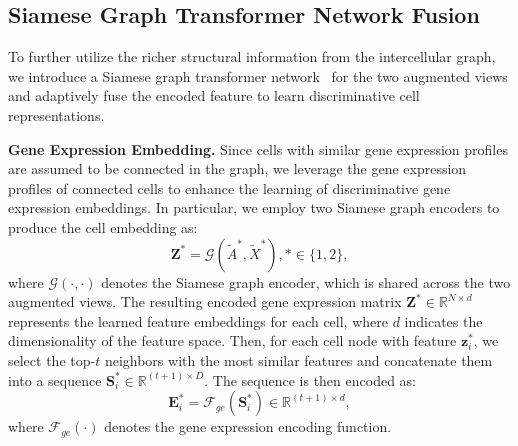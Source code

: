 


\subsection{Siamese Graph Transformer Network Fusion}
To further utilize the richer structural information from the intercellular graph, we introduce a Siamese graph transformer network~\cite{wang2025deep} for the two augmented views and adaptively fuse the encoded feature to learn discriminative cell representations.

\smallskip\noindent\textbf{Gene Expression Embedding.}
Since cells with similar gene expression profiles are assumed to be connected in the graph, we leverage the gene expression profiles of connected cells to enhance the learning of discriminative gene expression embeddings. In particular, we employ two Siamese graph encoders to produce the cell embedding as:
\begin{equation}
     \bm{Z}^*=\mathcal{G}(\tilde{A}^*,\tilde{X}^*), *\in\{1,2\},
\end{equation}
where $\mathcal{G}(\cdot,\cdot)$ denotes the Siamese graph encoder, which is shared across the two augmented views. The resulting encoded gene expression matrix $\bm{Z}^*\in\mathbb{R}^{N\times d}$ represents the learned feature embeddings for each cell, where $d$ indicates the dimensionality of the feature space. Then, for each cell node with feature $\bm{z}_i^*$, we select the top-$t$ neighbors with the most similar features and concatenate them into a sequence $\bm{S}_i^*\in\mathbb{R}^{(t+1)\times D}$. The sequence is then encoded as:
\begin{equation}
    \bm{E}_i^*=\mathcal{F}_{ge}(\bm{S}_i^*)\in\mathbb{R}^{(t+1)\times d},
\end{equation}
where $\mathcal{F}_{ge}(\cdot)$ denotes the gene expression encoding function.


